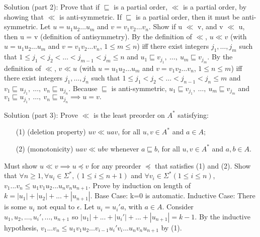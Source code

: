 \documentclass[12pt]{article}
\begin{document}
Solution (part 2): Prove that if $\sqsubseteq $ is a partial order,
$\ll$ is a partial order, by showing that $\ll$ is anti-symmetric.
If $\sqsubseteq $ is a partial order, then it must be anti-symmetric.
Let $u=u_{1}u_{2}\ldots u_{m}$ and $v=v_{1}v_{2}\ldots v_{n}$.
Show if u $\ll$ v, and v $\ll$ u, then u = v (definition of antisymmetry).
\newline
By the definition of $\ll$, $u \ll v$ (with $u=u_{1}u_{2}\ldots u_{m}$ and
$v=v_{1}v_{2}\ldots v_{n}$, $1\leq m\leq n$) iff there exist integers $j_{1},
\ldots,j_{m}$ such that $1\leq j_{1} < j_{2} < \ldots < j_{m-1} < j_{m} \leq n$
and $u_{1} \sqsubseteq v_{j_{1}},\ \ldots,\ u_{m} \sqsubseteq v_{j_{m}}$.
By the definition of $\ll$, $v \ll u$ (with $u=u_{1}u_{2}\ldots u_{m}$ and
$v=v_{1}v_{2}\ldots v_{n}$, $1\leq n\leq m$)
iff there exist integers $j_{1},\ldots,j_{n}$ such that
$1\leq j_{1} < j_{2} < \ldots < j_{n-1} < j_{n} \leq m$ and
$v_{1} \sqsubseteq u_{j_{1}},\ \ldots,\ v_{n} \sqsubseteq u_{j_{n}}.$
\newline
Because $\sqsubseteq $ is anti-symmetric, $u_{1} \sqsubseteq v_{j_{1}},\ \ldots,
\ u_{m} \sqsubseteq v_{j_{m}}$ and $v_{1} \sqsubseteq u_{j_{1}},\ \ldots,
\ v_{n} \sqsubseteq u_{j_{n}} \implies u = v.$

\medskip

Solution (part 3): Prove $\ll$ is the least preorder on $A^\ast$ satisfying:
\begin{enumerate}
\item[(1)] (deletion property)
$uv \ll uav$, for all $u, v\in A^{*}$ and $a\in A$;
\medskip
\item[(2)] (monotonicity) $uav \ll ubv$ whenever $a \sqsubseteq b$,
for all $u, v\in A^{*}$ and $a, b\in A$.
\end{enumerate}

\medskip

Must show $u \ll v \implies u \preceq v$
for any preorder $ \preceq $ that satisfies (1) and (2).
\newline
Show that $\forall n \ge 1, \forall u_i \in \Sigma^\ast ,
(1 \le i \le n+1)$ and $ \forall v_i \in \Sigma^\ast (1 \le i \le n)$,
$v_1...v_n \le u_1v_1u_2...u_nv_nu_{n+1}$.
Prove by induction on length of $k= |u_1|+|u_2|+ ... +|u_{n+1}|.$ 
\newline
Base Case: k=0 is automatic. 
\newline
Inductive Case: There is some $u_i$ not equal to $ \epsilon$.
Let $u_i = u_i ' a$, with $a \in A$.
\newline
Consider $u_1 ,u_2 , ... , u_i ' , ... , u_{n+1}$
so  $|u_1| + ... + |u_i '| + ... + |u_{n+1}| = k-1$. 
\newline
By the inductive hypothesis,
$v_1 ... v_n \le u_1 v_1 u_2 ... v_{i-1} u_i ' v_{i}...u_nv_nu_{n+1}$ by (1).
\end{document}
